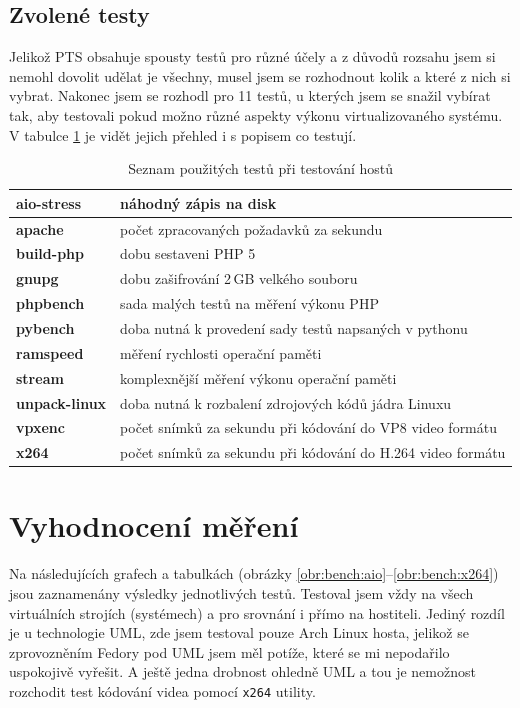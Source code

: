 \subsection{Zvolené testy}
Jelikož PTS obsahuje spousty testů pro různé účely a z důvodů rozsahu jsem si nemohl dovolit udělat je všechny, musel jsem se rozhodnout kolik a které z nich si vybrat. Nakonec jsem se rozhodl pro 11 testů, u kterých jsem se snažil vybírat tak, aby testovali pokud možno různé aspekty výkonu virtualizovaného systému. V tabulce \ref{tab:bench} je vidět jejich přehled i s popisem co testují.
\begin{table}[ht]
\begin{center}
    \begin{tabular}{|l|l|}
      \hline
       \textbf{aio-stress} & náhodný zápis na disk \\
      \hline
       \textbf{apache} & počet zpracovaných požadavků za sekundu \\
      \hline
       \textbf{build-php} & dobu sestaveni PHP 5 \\
      \hline
       \textbf{gnupg} & dobu zašifrování 2\,GB velkého souboru \\
      \hline
       \textbf{phpbench} & sada malých testů na měření výkonu PHP \\
      \hline
       \textbf{pybench} & doba nutná k provedení sady testů napsaných v pythonu \\
      \hline
       \textbf{ramspeed} & měření rychlosti operační paměti\\
      \hline
       \textbf{stream} & komplexnější měření výkonu operační paměti \\
      \hline
       \textbf{unpack-linux} & doba nutná k rozbalení zdrojových kódů jádra Linuxu \\
      \hline
       \textbf{vpxenc} & počet snímků za sekundu při kódování do VP8 video formátu \\
      \hline
       \textbf{x264} & počet snímků za sekundu při kódování do H.264 video formátu \\
      \hline
    \end{tabular}
 \caption{Seznam použitých testů při testování hostů}
 \label{tab:bench}
\end{center}
\end{table}

\section{Vyhodnocení měření}
Na následujících grafech a tabulkách (obrázky \ref{obr:bench:aio}--\ref{obr:bench:x264}) jsou zaznamenány výsledky jednotlivých testů. Testoval jsem vždy na všech virtuálních strojích (systémech) a pro srovnání i přímo na hostiteli. Jediný rozdíl je u technologie UML, zde jsem testoval pouze Arch Linux hosta, jelikož se zprovozněním Fedory pod UML jsem měl potíže, které se mi nepodařilo uspokojivě vyřešit. A ještě jedna drobnost ohledně UML a tou je nemožnost rozchodit test kódování videa pomocí \texttt{x264} utility.

